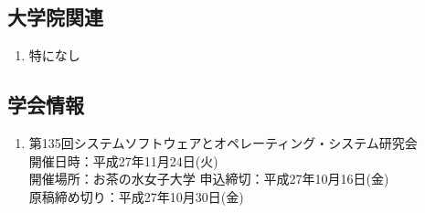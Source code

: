 \documentclass[fleqn, 14pt]{extarticle}
\begin{document}
    \subsection{大学院関連}
    \begin{enumerate}

        \item 特になし
            \hfill
            \label{enum-17}

    \end{enumerate}

    \subsection{学会情報} 
    \begin{enumerate}
        \item 第135回システムソフトウェアとオペレーティング・システム研究会\\
            開催日時：平成27年11月24日(火)\\
            開催場所：お茶の水女子大学
            申込締切：平成27年10月16日(金)\\
            原稿締め切り：平成27年10月30日(金)\\
    \end{enumerate}

    
\end{document}
